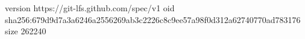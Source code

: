version https://git-lfs.github.com/spec/v1
oid sha256:679d9d7a3a6246a2556269ab3c2226c8c9ee57a98f0d312a62740770ad783176
size 262240
